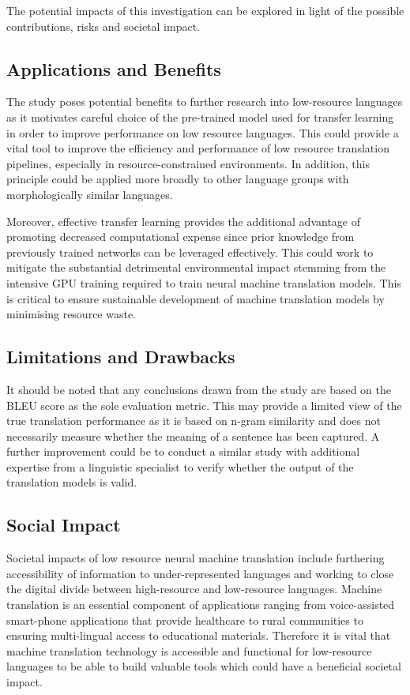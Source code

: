 \documentclass[11pt]{article}
\begin{document}
The potential impacts of this investigation can be explored in light of the possible contributions, risks and societal impact.

\subsection{Applications and Benefits}

The study poses potential benefits to further research into low-resource languages as it motivates careful choice of the pre-trained model used for transfer learning in order to improve performance on low resource languages. This could provide a vital tool to improve the efficiency and performance of low resource translation pipelines, especially in resource-constrained environments. In addition, this principle could be applied more broadly to other language groups with morphologically similar languages.

Moreover, effective transfer learning provides the additional advantage of promoting decreased computational expense since prior knowledge from previously trained networks can be leveraged effectively. This could work to mitigate the substantial detrimental environmental impact stemming from the intensive GPU training required to train neural machine translation models. This is critical to ensure sustainable development of machine translation models by minimising resource waste.

 

\subsection{Limitations and Drawbacks}

It should be noted that any conclusions drawn from the study are based on the BLEU score as the sole evaluation metric. This may provide a limited view of the true translation performance as it is based on n-gram similarity and does not necessarily measure whether the meaning of a sentence has been captured. A further improvement could be to conduct a similar study with additional expertise from a linguistic specialist to verify whether the output of the translation models is valid.


\subsection{Social Impact}

Societal impacts of low resource neural machine translation include furthering accessibility of information to under-represented languages and working to close the digital divide between high-resource and low-resource languages. Machine translation is an essential component of applications ranging from voice-assisted smart-phone applications that provide healthcare to rural communities to ensuring multi-lingual access to educational materials. Therefore it is vital that machine translation technology is accessible and functional for low-resource languages to be able to build valuable tools which could have a beneficial societal impact.
\end{document}
